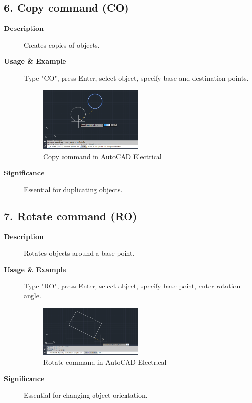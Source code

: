 \documentclass[12pt]{article}
\begin{document}
\subsection*{6. Copy command (CO)}
\begin{description}
    \item [\textbf{Description}] Creates copies of objects.
    \item [\textbf{Usage \& Example}] Type "CO", press Enter, select object, specify base and destination points.
          \begin{figure}[H]
              \centering
              \includegraphics[width=0.5\textwidth]{copy_command.png}
              \caption{Copy command in AutoCAD Electrical}
          \end{figure}
    \item [\textbf{Significance}] Essential for duplicating objects.
\end{description}

\subsection*{7. Rotate command (RO)}
\begin{description}
    \item [\textbf{Description}] Rotates objects around a base point.
    \item [\textbf{Usage \& Example}] Type "RO", press Enter, select object, specify base point, enter rotation angle.
          \begin{figure}[H]
              \centering
              \includegraphics[width=0.5\textwidth]{rotate_command.png}
              \caption{Rotate command in AutoCAD Electrical}
          \end{figure}
    \item [\textbf{Significance}] Essential for changing object orientation.
\end{description}
\end{document}
